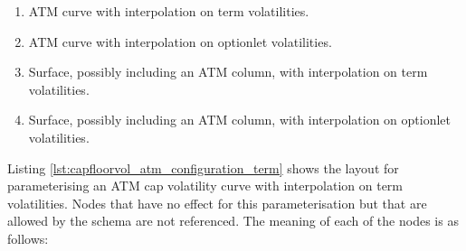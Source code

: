 \begin{enumerate}
\item ATM curve with interpolation on term volatilities.
\item ATM curve with interpolation on optionlet volatilities.
\item Surface, possibly including an ATM column, with interpolation on term volatilities.
\item Surface, possibly including an ATM column, with interpolation on optionlet volatilities.
\end{enumerate}

Listing \ref{lst:capfloorvol_atm_configuration_term} shows the layout for parameterising an ATM cap volatility curve with interpolation on term volatilities. Nodes that have no effect for this parameterisation but that are allowed by the schema are not referenced. The meaning of each of the nodes is as follows:

